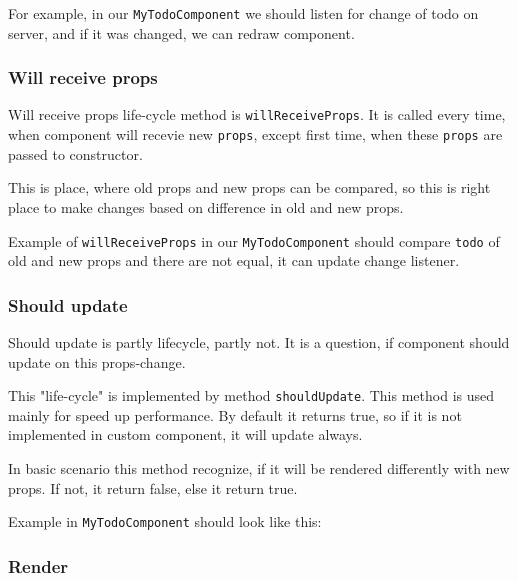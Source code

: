       For example, in our \texttt{MyTodoComponent} we should listen for change of todo on server, 
      and if it was changed, we can redraw component.
      

    \subsubsection{Will receive props}\label{subsec:our-architecture-lifecycle-willreceiveprops}

      Will receive props life-cycle method is \texttt{willReceiveProps}. 
      It is called every time, when component will recevie new \texttt{props}, 
      except first time, when these \texttt{props} are passed to constructor.

      This is place, where old props and new props can be compared, 
      so this is right place to make changes based on difference in old and new props.

      Example of \texttt{willReceiveProps} in our \texttt{MyTodoComponent} 
      should compare \texttt{todo} of old and new props and there are not equal, 
      it can update change listener.
      
      
      
    \subsubsection{Should update}\label{subsec:our-architecture-lifecycle-shouldupdate}
      Should update is partly lifecycle, partly not. 
      It is a question, if component should update on  this props-change. 

      This "life-cycle" is implemented by method \texttt{shouldUpdate}. 
      This method is used mainly for speed up performance. 
      By default it returns true, 
      so if it is not implemented in custom component, 
      it will update always.

      In basic scenario this method recognize, 
      if it will be rendered differently with new props.  
      If not, it return false, else it return true.

      Example in \texttt{MyTodoComponent} should look like this:
      

    \subsubsection{Render}\label{subsec:our-architecture-lifecycle-render}


